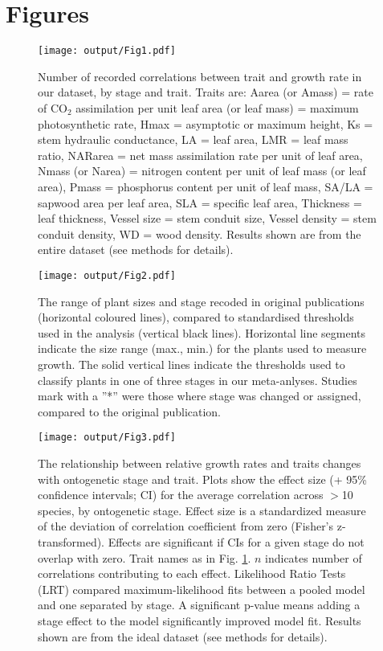\documentclass[a4paper,11pt]{article}
\begin{document}
\clearpage
\section*{Figures}

\begin{figure}[h!]
\centering
\texttt{[image: output/Fig1.pdf]}
\caption{Number of recorded correlations between trait and growth rate in our dataset, by stage and trait. Traits are: Aarea (or Amass) = rate of CO$_{2}$ assimilation per unit leaf area (or leaf mass) = maximum photosynthetic rate, Hmax = asymptotic or maximum height,  Ks = stem hydraulic conductance, LA = leaf area, LMR = leaf mass ratio, NARarea = net mass assimilation rate per unit of leaf area, Nmass (or Narea) = nitrogen content per unit of leaf mass (or leaf area), Pmass = phosphorus content per unit of leaf mass, SA/LA = sapwood area per leaf area, SLA = specific leaf area, Thickness = leaf thickness, Vessel size = stem conduit size, Vessel density = stem conduit density, WD = wood density. Results shown are from the entire dataset (see methods for details).}
\label{fig:fig1}
\end{figure}


\begin{figure}[h!]
\centering
\texttt{[image: output/Fig2.pdf]}
\caption{The range of plant sizes and stage recoded in original publications (horizontal coloured lines), compared to standardised thresholds used in the analysis (vertical black lines). Horizontal line segments indicate the size range (max., min.) for the plants used to measure growth. The solid vertical lines indicate the thresholds used to classify plants in one of three stages in our meta-anlyses. Studies mark with a ''*'' were those where stage was changed or assigned, compared to the original publication. }
\label{fig:fig2}
\end{figure}



\begin{figure}[h!]
\centering
\texttt{[image: output/Fig3.pdf]}
\caption{The relationship between relative growth rates and traits changes with ontogenetic stage and trait. Plots show the effect size (+ 95\% confidence intervals; CI) for the average correlation across $>$10 species, by ontogenetic stage. Effect size is a standardized measure of the deviation of correlation coefficient from zero (Fisher's z-transformed). Effects are significant if CIs for a given stage do not overlap with zero. Trait names as in Fig. \ref{fig:fig1}. $n$ indicates number of correlations contributing to each effect. Likelihood Ratio Tests (LRT) compared maximum-likelihood fits between a pooled model and one separated by stage. A significant p-value means adding a stage effect to the model significantly improved model fit. Results shown are from the ideal dataset (see methods for details).}
\label{fig:fig3}
\end{figure}
\end{document}
